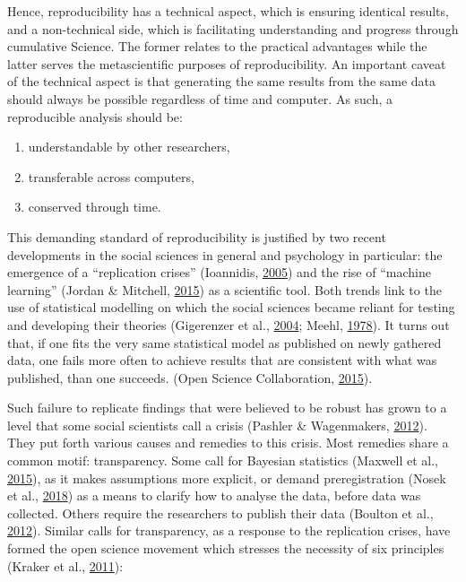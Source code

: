 \documentclass[12pt,a4paper,twoside]{article}
\providecommand{\tightlist}{%
  \setlength{\itemsep}{0pt}\setlength{\parskip}{0pt}}
\begin{document}
Hence, reproducibility has a technical aspect, which is ensuring identical results, and a non-technical side, which is facilitating understanding and progress through cumulative Science.
The former relates to the practical advantages while the latter serves the metascientific purposes of reproducibility.
An important caveat of the technical aspect is that generating the same results from the same data should always be possible regardless of time and computer.
As such, a reproducible analysis should be:

\begin{enumerate}
\def\labelenumi{\arabic{enumi}.}
\tightlist
\item
  understandable by other researchers,
\item
  transferable across computers,
\item
  conserved through time.
\end{enumerate}

This demanding standard of reproducibility is justified by two recent developments in the social sciences in general and psychology in particular: the emergence of a ``replication crises'' (Ioannidis, \protect\hyperlink{ref-ioannidisWhyMostPublished2005}{2005}) and the rise of ``machine learning'' (Jordan \& Mitchell, \protect\hyperlink{ref-jordanMachineLearningTrends2015}{2015}) as a scientific tool.
Both trends link to the use of statistical modelling on which the social sciences became reliant for testing and developing their theories (Gigerenzer et al., \protect\hyperlink{ref-gigerenzerNullRitualWhat2004}{2004}; Meehl, \protect\hyperlink{ref-meehlTheoreticalRisksTabular1978}{1978}).
It turns out that, if one fits the very same statistical model as published on newly gathered data, one fails more often to achieve results that are consistent with what was published, than one succeeds. (Open Science Collaboration, \protect\hyperlink{ref-opensciencecollaborationEstimatingReproducibilityPsychological2015}{2015}).

Such failure to replicate findings that were believed to be robust has grown to a level that some social scientists call a crisis (Pashler \& Wagenmakers, \protect\hyperlink{ref-pashlerEditorsIntroductionSpecial2012}{2012}).
They put forth various causes and remedies to this crisis.
Most remedies share a common motif: transparency.
Some call for Bayesian statistics (Maxwell et al., \protect\hyperlink{ref-maxwellPsychologySufferingReplication2015}{2015}), as it makes assumptions more explicit, or demand preregistration (Nosek et al., \protect\hyperlink{ref-nosekPreregistrationRevolution2018}{2018}) as a means to clarify how to analyse the data, before data was collected.
Others require the researchers to publish their data (Boulton et al., \protect\hyperlink{ref-boultonScienceOpenEnterprise2012}{2012}).
Similar calls for transparency, as a response to the replication crises, have formed the open science movement which stresses the necessity of six principles (Kraker et al., \protect\hyperlink{ref-krakerCaseOpenScience2011}{2011}):
\end{document}
